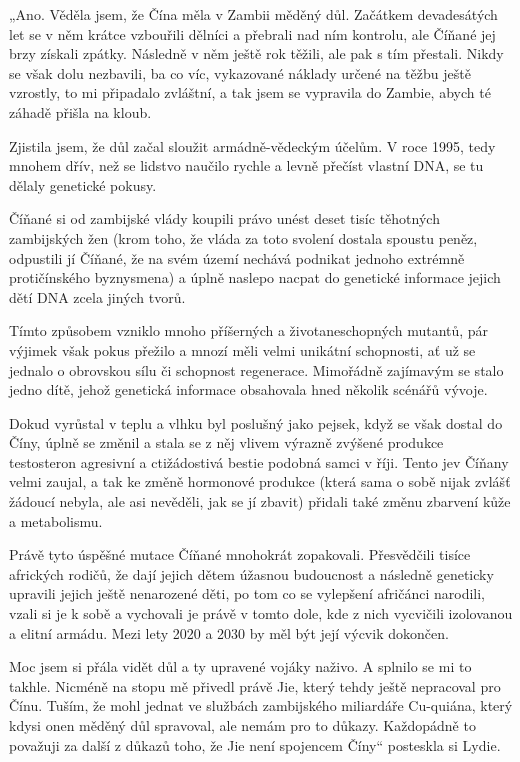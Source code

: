 „Ano. Věděla jsem, že Čína měla v Zambii měděný důl. Začátkem devadesátých let se v něm krátce vzbouřili dělníci a přebrali nad ním kontrolu, ale Číňané jej brzy získali zpátky. Následně v něm ještě rok těžili, ale pak s tím přestali. Nikdy se však dolu nezbavili, ba co víc, vykazované náklady určené na těžbu ještě vzrostly, to mi připadalo zvláštní, a tak jsem se vypravila do Zambie, abych té záhadě přišla na kloub.

Zjistila jsem, že důl začal sloužit armádně-vědeckým účelům. V roce 1995, tedy mnohem dřív, než se lidstvo naučilo rychle a levně přečíst vlastní DNA, se tu dělaly genetické pokusy.

Číňané si od zambijské vlády koupili právo unést deset tisíc těhotných zambijských žen (krom toho, že vláda za toto svolení dostala spoustu peněz, odpustili jí Číňané, že na svém území nechává podnikat jednoho extrémně protičínského byznysmena) a úplně naslepo nacpat do genetické informace jejich dětí DNA zcela jiných tvorů.

Tímto způsobem vzniklo mnoho příšerných a životaneschopných mutantů, pár výjimek však pokus přežilo a mnozí měli velmi unikátní schopnosti, ať už se jednalo o obrovskou sílu či schopnost regenerace. Mimořádně zajímavým se stalo jedno dítě, jehož genetická informace obsahovala hned několik scénářů vývoje.

Dokud vyrůstal v teplu a vlhku byl poslušný jako pejsek, když se však dostal do Číny, úplně se změnil a stala se z něj vlivem výrazně zvýšené produkce testosteron agresivní a ctižádostivá bestie podobná samci v říji. Tento jev Číňany velmi zaujal, a tak ke změně hormonové produkce (která sama o sobě nijak zvlášť žádoucí nebyla, ale asi nevěděli, jak se jí zbavit) přidali také změnu zbarvení kůže a metabolismu.

Právě tyto úspěšné mutace Číňané mnohokrát zopakovali. Přesvědčili tisíce afrických rodičů, že dají jejich dětem úžasnou budoucnost a následně geneticky upravili jejich ještě nenarozené děti, po tom co se vylepšení afričánci narodili, vzali si je k sobě a vychovali je právě v tomto dole, kde z nich vycvičili izolovanou a elitní armádu. Mezi lety 2020 a 2030 by měl být její výcvik dokončen.

Moc jsem si přála vidět důl a ty upravené vojáky naživo. A splnilo se mi to takhle. Nicméně na stopu mě přivedl právě Jie, který tehdy ještě nepracoval pro Čínu. Tuším, že mohl jednat ve službách zambijského miliardáře Cu-quiána, který kdysi onen měděný důl spravoval, ale nemám pro to důkazy. Každopádně to považuji za další z důkazů toho, že Jie není spojencem Číny“ posteskla si Lydie.
\vspace{0.75cm}

